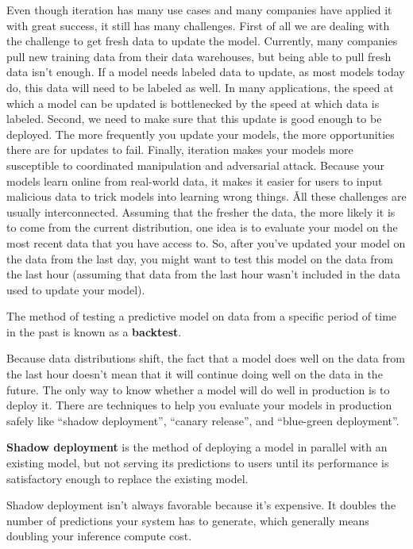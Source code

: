 Even though iteration has many use cases and many companies have applied it with great success, it still has many
challenges. First of all we are dealing with the challenge to get fresh data to update the model. Currently, many
companies pull new training data from their data warehouses, but being able to pull fresh data isn't enough. If a
model needs labeled data to update, as most models today do, this data will need to be labeled as well. In many
applications, the speed at which a model can be updated is bottlenecked by the speed at which data is labeled. Second,
we need to make sure that this update is good enough to be deployed. The more frequently you update your models,
the more opportunities there are for updates to fail. Finally, iteration makes your models more susceptible to
coordinated manipulation and adversarial attack. Because your models learn online from real-world data, it makes it
easier for users to input malicious data to trick models into learning wrong things. \v

All these challenges are usually interconnected. Assuming that the fresher the data, the more likely it is to come
from the current distribution, one idea is to evaluate your model on the most recent data that you have access to. So,
after you've updated your model on the data from the last day, you might want to test this model on the data from
the last hour (assuming that data from the last hour wasn't included in the data used to update your model).

\bd[Backtest]
The method of testing a predictive model on data from a specific period of time in the past is known as a
\textbf{backtest}.
\ed

Because data distributions shift, the fact that a model does well on the data from the last hour doesn't mean that it
will continue doing well on the data in the future. The only way to know whether a model will do well in production
is to deploy it. There are techniques to help you evaluate your models in production safely like ``shadow deployment'',
``canary release'', and ``blue-green deployment''.

\textbf{Shadow deployment} is the method of deploying a model in parallel with an existing model, but not serving
its predictions to users until its performance is satisfactory enough to replace the existing model.
\ed

Shadow deployment isn't always favorable because it's expensive. It doubles the number of predictions your system has
to generate, which generally means doubling your inference compute cost.

